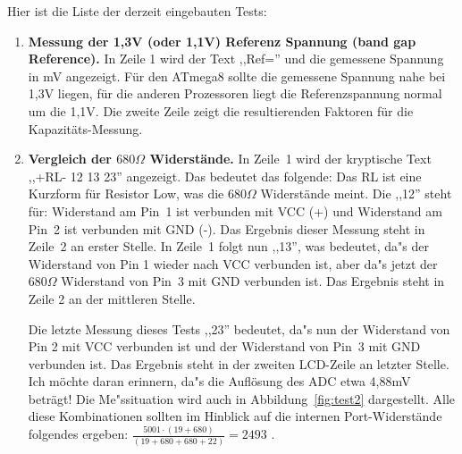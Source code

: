 \vspace{1cm}
Hier ist die Liste der derzeit eingebauten Tests:
\vspace{1cm}
\begin{enumerate}
\item {\bf Messung der 1,3V (oder 1,1V) Referenz Spannung (band gap Reference).} In Zeile 1 wird der Text ,,Ref='' und die
gemessene Spannung in mV angezeigt.
F\"ur den ATmega8 sollte die gemessene Spannung nahe bei 1,3V liegen, f\"ur die anderen Prozessoren liegt
die Referenzspannung normal um die 1,1V.
Die zweite Zeile zeigt die resultierenden Faktoren f\"ur die Kapazit\"ats-Messung.
\item {\bf Vergleich der \(680\Omega\) Widerst\"ande.} 
In Zeile~1 wird der kryptische Text  ,,+RL- 12 13 23'' angezeigt. Das bedeutet das folgende:
Das RL ist eine Kurzform f\"ur Resistor Low, was die \(680\Omega\) Widerst\"ande meint. Die ,,12'' steht f\"ur: 
Widerstand am Pin~1 ist verbunden mit VCC (+) und Widerstand am Pin~2 ist verbunden mit GND (-). 
Das Ergebnis dieser Messung steht in Zeile~2 an erster Stelle.
 In Zeile~1 folgt nun ,,13'', was bedeutet, da"s der Widerstand von Pin 1 wieder nach VCC verbunden ist,
aber da"s jetzt der \(680\Omega\) Widerstand von Pin~3  mit GND verbunden ist.
Das Ergebnis steht in Zeile 2 an der mittleren Stelle.

Die letzte Messung dieses Tests ,,23'' bedeutet, da"s nun der Widerstand von Pin 2 mit VCC verbunden ist und
der Widerstand von Pin~3 mit GND verbunden ist.
Das Ergebnis steht in der zweiten LCD-Zeile an letzter Stelle.
Ich m\"ochte daran erinnern, da"s die Aufl\"osung des ADC etwa 4,88mV betr\"agt!
Die Me"ssituation wird auch in Abbildung~\ref{fig:test2} dargestellt.
Alle diese Kombinationen sollten im Hinblick auf die internen Port-Widerst\"ande folgendes ergeben:
\(\frac{5001 \cdot  (19+680)}{ (19+680+680+22)} = 2493\) .


\end{enumerate}
